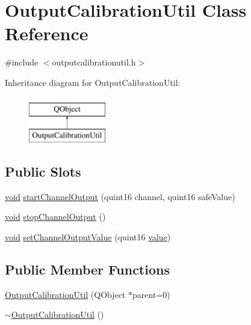 \hypertarget{class_output_calibration_util}{\section{Output\-Calibration\-Util Class Reference}
\label{class_output_calibration_util}
}


{\ttfamily \#include $<$outputcalibrationutil.\-h$>$}

Inheritance diagram for Output\-Calibration\-Util\-:\begin{figure}[H]
\begin{center}
\leavevmode
\includegraphics[height=2.000000cm]{class_output_calibration_util}
\end{center}
\end{figure}
\subsection*{Public Slots}
\begin{DoxyCompactItemize}
\item 
\hyperlink{group___u_a_v_objects_plugin_ga444cf2ff3f0ecbe028adce838d373f5c}{void} \hyperlink{group___output_calibration_util_ga4e257b02b35e22c737c50cbeab039173}{start\-Channel\-Output} (quint16 channel, quint16 safe\-Value)
\item 
\hyperlink{group___u_a_v_objects_plugin_ga444cf2ff3f0ecbe028adce838d373f5c}{void} \hyperlink{group___output_calibration_util_ga82c5762c4c3caeebb767eff46035ba59}{stop\-Channel\-Output} ()
\item 
\hyperlink{group___u_a_v_objects_plugin_ga444cf2ff3f0ecbe028adce838d373f5c}{void} \hyperlink{group___output_calibration_util_gae8a819e164b2c70af5e6e884ffea3519}{set\-Channel\-Output\-Value} (quint16 \hyperlink{glext_8h_aa0e2e9cea7f208d28acda0480144beb0}{value})
\end{DoxyCompactItemize}
\subsection*{Public Member Functions}
\begin{DoxyCompactItemize}
\item 
\hyperlink{group___output_calibration_util_gad4fa78a9ae7280d3f4476614ab1b75bc}{Output\-Calibration\-Util} (Q\-Object $\ast$parent=0)
\item 
\hyperlink{group___output_calibration_util_gabc2baa99b6831e09b1a481dbdcae92ab}{$\sim$\-Output\-Calibration\-Util} ()
\end{DoxyCompactItemize}


